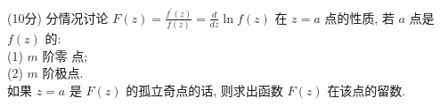 \documentclass{njustexam}
\begin{document}



\begin{problem}{(10分)}
分情况讨论 $F(z)=\frac{f^{\prime}(z)}{f(z)}=\frac{d}{d z} \ln f(z)$ 在 $z=a$ 点的性质, 
  若 $a$ 点是 $f(z)$ 的: 
  \\
  (1) $m$ 阶零 点; 
  \\
  (2) $m$ 阶极点.
  \\
  如果 $z=a$ 是 $F(z)$ 的孤立奇点的话, 则求出函数 $F(z)$ 在该点的留数.
\end{problem}



\end{document}
